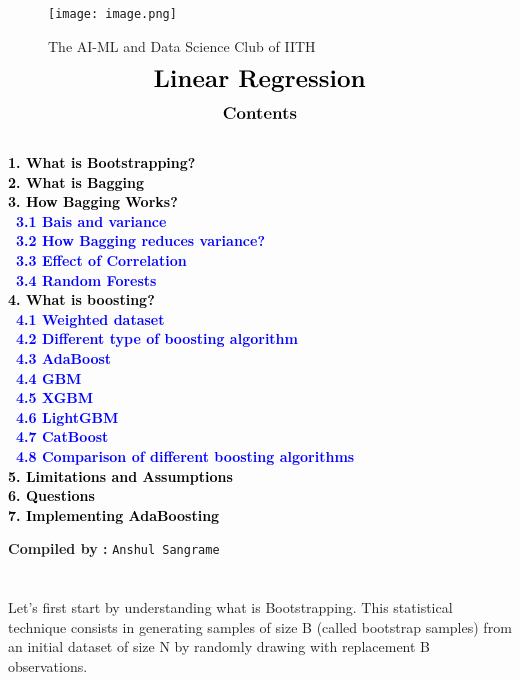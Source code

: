 \documentclass{homework}
\begin{document}
\begin{center}
\begin{figure}[h]
\centering
\texttt{[image: image.png]}
\caption*{{{\selectfont The AI-ML and Data Science Club of IITH}}}
\end{figure}
\end{center}
\begin{align*}
{\LARGE{\textbf{Linear Regression}}}
\end{align*}
\graphicspath{{./media/}}
\begin{align*}
\large{\textbf{{Contents}}}
\end{align*}
{\textcolor{black}{\textbf{
 \\
 1. {What is Bootstrapping?}\\
 2. {What is Bagging}\\
 3. {How Bagging Works?}\\
\indent \    \textcolor{blue}{3.1 Bais and variance}\\
\indent \    \textcolor{blue}{3.2 How Bagging reduces variance?}\\
\indent \    \textcolor{blue}{3.3 Effect of Correlation}\\
\indent \    \textcolor{blue}{3.4 Random Forests}\\
 4. {What is boosting?}\\
\indent \  \textcolor{blue}{4.1 Weighted dataset}\\
\indent \  \textcolor{blue}{4.2 Different type of boosting algorithm}\\
\indent \  \textcolor{blue}{4.3 AdaBoost}\\
\indent \  \textcolor{blue}{4.4 GBM}\\
\indent \  \textcolor{blue}{4.5 XGBM}\\
\indent \  \textcolor{blue}{4.6 LightGBM}\\
\indent \  \textcolor{blue}{4.7 CatBoost}\\
\indent \  \textcolor{blue}{4.8 Comparison of different boosting algorithms}\\
5. {Limitations and Assumptions}\\
6. {Questions}\\
7. {Implementing AdaBoosting}\\}}}
\begin{center}
    {\textbf{Compiled by :}
    \texttt{Anshul Sangrame}}
\end{center}

\newpage
\section{}
Let's first start by understanding what is Bootstrapping. This statistical technique consists in generating samples of size B (called bootstrap samples) from an initial dataset of size N by randomly drawing with replacement B observations.
\end{document}
